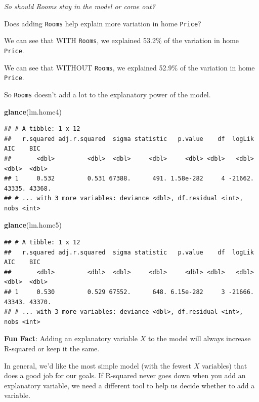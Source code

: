 \documentclass[
]{book}
\newenvironment{Shaded}{\begin{snugshade}}{\end{snugshade}}
\newcommand{\KeywordTok}[1]{\textcolor[rgb]{0.13,0.29,0.53}{\textbf{#1}}}
\newcommand{\NormalTok}[1]{#1}
\begin{document}
\emph{So should Rooms stay in the model or come out?}

Does adding \texttt{Rooms} help explain more variation in home \texttt{Price}?

We can see that WITH \texttt{Rooms}, we explained 53.2\% of the variation in home \texttt{Price}.

We can see that WITHOUT \texttt{Rooms}, we explained 52.9\% of the variation in home \texttt{Price}.

So \texttt{Rooms} doesn't add a lot to the explanatory power of the model.

\begin{Shaded}
\begin{Highlighting}[]
\KeywordTok{glance}\NormalTok{(lm.home4)}
\end{Highlighting}
\end{Shaded}

\begin{verbatim}
## # A tibble: 1 x 12
##   r.squared adj.r.squared  sigma statistic   p.value    df  logLik    AIC    BIC
##       <dbl>         <dbl>  <dbl>     <dbl>     <dbl> <dbl>   <dbl>  <dbl>  <dbl>
## 1     0.532         0.531 67388.      491. 1.58e-282     4 -21662. 43335. 43368.
## # ... with 3 more variables: deviance <dbl>, df.residual <int>, nobs <int>
\end{verbatim}

\begin{Shaded}
\begin{Highlighting}[]
\KeywordTok{glance}\NormalTok{(lm.home5)}
\end{Highlighting}
\end{Shaded}

\begin{verbatim}
## # A tibble: 1 x 12
##   r.squared adj.r.squared  sigma statistic   p.value    df  logLik    AIC    BIC
##       <dbl>         <dbl>  <dbl>     <dbl>     <dbl> <dbl>   <dbl>  <dbl>  <dbl>
## 1     0.530         0.529 67552.      648. 6.15e-282     3 -21666. 43343. 43370.
## # ... with 3 more variables: deviance <dbl>, df.residual <int>, nobs <int>
\end{verbatim}

\textbf{Fun Fact}: Adding an explanatory variable \(X\) to the model will always increase R-squared or keep it the same.

In general, we'd like the most simple model (with the fewest \(X\) variables) that does a good job for our goals. If R-squared never goes down when you add an explanatory variable, we need a different tool to help us decide whether to add a variable.
\end{document}
